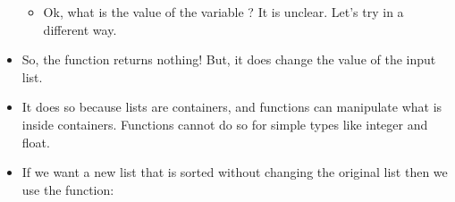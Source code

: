 \documentclass[letterpaper,10pt,english]{sphinxmanual}
\begin{document}
\begin{itemize}
%
\begin{sphinxVerbatim}[commandchars=\\\{\}]
  \PYG{p}{[}        \PYG{p}{]}
  
\end{sphinxVerbatim}
\begin{itemize}
\item {} 
Ok, what is the value of the variable ? It is
unclear. Let’s  try in a different way.

\end{itemize}

%
\begin{sphinxVerbatim}[commandchars=\\\{\}]
\end{sphinxVerbatim}

\item {} 
So, the function returns nothing! But, it does change the value of
the input list.

\item {} 
It does so because lists are containers, and functions can
manipulate what is inside containers. Functions cannot do so for simple
types like integer and float.

\item {} 
If we want a new list that is sorted without changing the original list
then we use the  function:

%
\begin{sphinxVerbatim}[commandchars=\\\{\}]
  \PYG{p}{[}        \PYG{p}{]}
  
\end{sphinxVerbatim}

\end{itemize}
\end{document}
